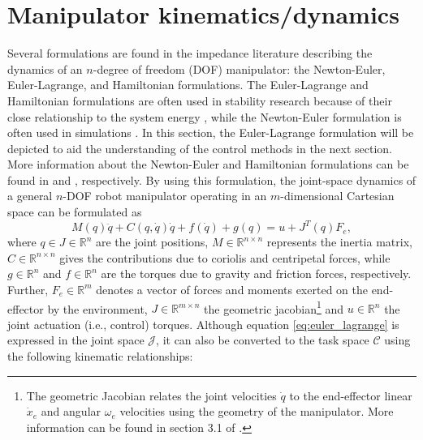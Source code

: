 \section{Manipulator kinematics/dynamics}

Several formulations are found in the impedance literature describing the dynamics of an $n$-degree of freedom (DOF) manipulator: the Newton-Euler, Euler-Lagrange, and Hamiltonian formulations. The Euler-Lagrange and Hamiltonian formulations are often used in stability research because of their close relationship to the system energy \cite{haddadNonlinearDynamicalSystems2011}, while the Newton-Euler formulation is often used in simulations \cite{sicilianoRoboticsModellingPlanning2010}. In this section, the Euler-Lagrange formulation will be depicted to aid the understanding of the control methods in the next section. More information about the Newton-Euler and Hamiltonian formulations can be found in \cite{sicilianoRoboticsModellingPlanning2010} and \cite{baoProcessControlPassive2007}, respectively. By using this formulation, the joint-space dynamics of a general $n$-DOF robot manipulator operating in an $m$-dimensional Cartesian space can be formulated as
\begin{equation} \label{eq:euler_lagrange}
  M \left( q \right)\ddot{ q }+ C \left( q ,\dot{ q }\right)\dot{ q }+ f \left(\dot{ q }\right)+ g \left( q \right)= u + J^T \left( q \right) F_e,
\end{equation}
where $q \in J \in\mathbb{R}^n$ are the joint positions, $M \in\mathbb{R}^{n \times n}$ represents the inertia matrix, $C \in\mathbb{R}^{ n \times n }$ gives the contributions due to coriolis and centripetal forces, while $g \in\mathbb{R}^n$ and $f \in\mathbb{R}^n$ are the torques due to gravity and friction forces, respectively. Further, $F_e \in\mathbb{R}^m$ denotes a vector of forces and moments exerted on the end-effector by the environment, $J \in\mathbb{R}^{ m \times n }$ the geometric jacobian\footnote{The geometric Jacobian relates the joint velocities $\dot{q}$ to the end-effector linear $\dot{x}_e$ and angular $\omega_e$ velocities using the geometry of the manipulator. More information can be found in section 3.1 of \cite{sicilianoRoboticsModellingPlanning2010}.} and $u \in\mathbb{R}^n$ the joint actuation (i.e., control) torques. Although equation \eqref{eq:euler_lagrange} is expressed in the joint space $\mathcal{J}$, it can also be converted to the task space $\mathcal{C}$ using the following kinematic relationships:

